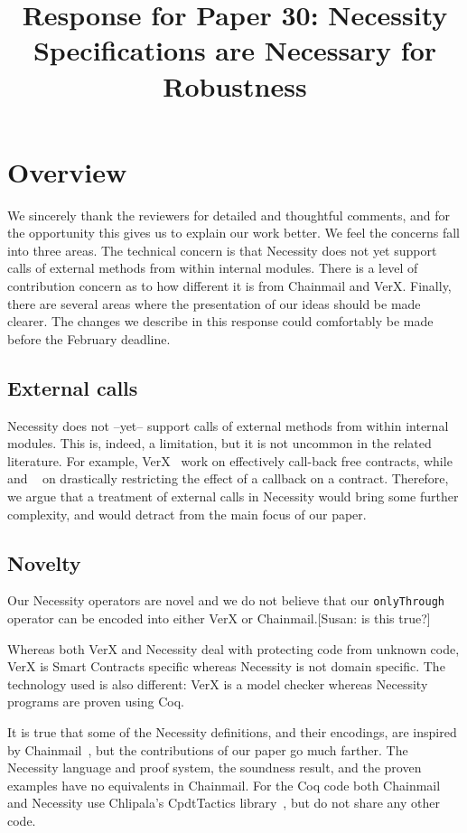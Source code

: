 \documentclass[11pt]{amsart}
\title{Response for Paper 30: Necessity Specifications are Necessary for Robustness }
\begin{document}
\maketitle
\section{Overview}
We sincerely thank the reviewers for detailed and thoughtful comments, and for the opportunity this gives us to explain our work better. We feel the concerns fall into three areas. The technical concern is that Necessity does not yet support calls of external methods from within internal modules. There is a level of contribution concern as to how different it is from Chainmail and VerX. Finally, there are several areas where the presentation of our ideas should be made clearer. The changes we describe in this response could comfortably be made before the February deadline.

\subsection*{External calls}

Necessity does not --yet-- support calls of external methods from within internal modules. This is, indeed, a limitation, but it is not uncommon in the related literature. For example, VerX~\citep{Permenev} work on effectively call-back free contracts, while~\citep{Grossman} and ~\citep{Albert} on drastically restricting the effect of a callback on a contract. Therefore, we argue that a treatment of  external calls in Necessity would bring some further complexity, and would  detract from the main focus of our paper.  

\subsection*{Novelty}

Our Necessity operators are novel and we do not believe that our {\tt{onlyThrough}} operator can be encoded into either VerX or Chainmail.[Susan: is this true?]

Whereas both VerX and Necessity deal with protecting code from unknown code, VerX is Smart Contracts specific whereas Necessity is not domain specific.  The technology used is also different: VerX is a model checker whereas Necessity programs are proven using Coq.

It is true that some of the Necessity definitions, and their encodings, are inspired by Chainmail~\citep{Drossopoulou}, 
but the contributions of our paper go much farther.
The Necessity language and proof system, 
the soundness result, and the proven examples have no equivalents in Chainmail.
For the Coq code both Chainmail and Necessity use Chlipala's CpdtTactics library~\citep{Chlipala}, but do not share any other code.
\end{document}
